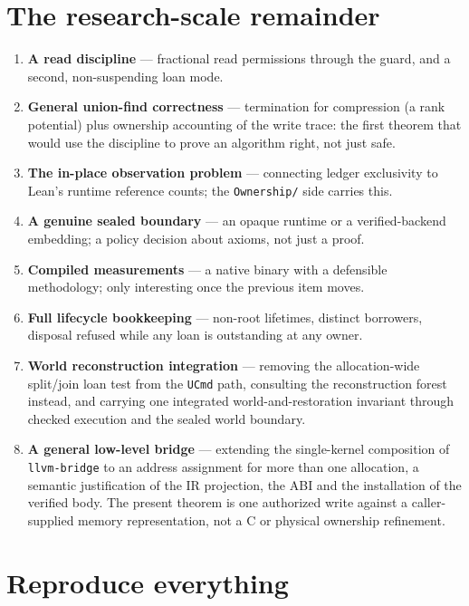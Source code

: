 \documentclass[10pt,a4paper]{article}
\newcommand{\file}[1]{\texttt{#1}}
\newcommand{\lean}[1]{\texttt{#1}}
\begin{document}
\section{The research-scale remainder}

\begin{enumerate}[leftmargin=1.6em]
\item \textbf{A read discipline} --- fractional read permissions through the
  guard, and a second, non-suspending loan mode.
\item \textbf{General union-find correctness} --- termination for compression
  (a rank potential) plus ownership accounting of the write trace: the first
  theorem that would use the discipline to prove an algorithm right, not just
  safe.
\item \textbf{The in-place observation problem} --- connecting ledger
  exclusivity to Lean's runtime reference counts; the \file{Ownership/} side
  carries this.
\item \textbf{A genuine sealed boundary} --- an opaque runtime or a
  verified-backend embedding; a policy decision about axioms, not just a proof.
\item \textbf{Compiled measurements} --- a native binary with a defensible
  methodology; only interesting once the previous item moves.
\item \textbf{Full lifecycle bookkeeping} --- non-root lifetimes, distinct
  borrowers, disposal refused while any loan is outstanding at any owner.
\item \textbf{World reconstruction integration} --- removing the
  allocation-wide split/join loan test from the \lean{UCmd} path, consulting the
  reconstruction forest instead, and carrying one integrated
  world-and-restoration invariant through checked execution and the sealed world
  boundary.
\item \textbf{A general low-level bridge} --- extending the single-kernel
  composition of \file{llvm-bridge} to an address assignment for more than one
  allocation, a semantic justification of the IR projection, the ABI and the
  installation of the verified body. The present theorem is one authorized write
  against a caller-supplied memory representation, not a C or physical ownership
  refinement.
\end{enumerate}

\section{Reproduce everything}
\end{document}

